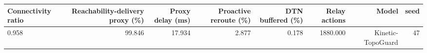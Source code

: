 \begin{tabular}{lrrrrrrr}
\toprule
Connectivity ratio & Reachability-delivery proxy (\%) & Proxy delay (ms) & Proactive reroute (\%) & DTN buffered (\%) & Relay actions & Model & seed \\
\midrule
0.958 & 99.846 & 17.934 & 2.877 & 0.178 & 1880.000 & Kinetic-TopoGuard & 47 \\
\bottomrule
\end{tabular}